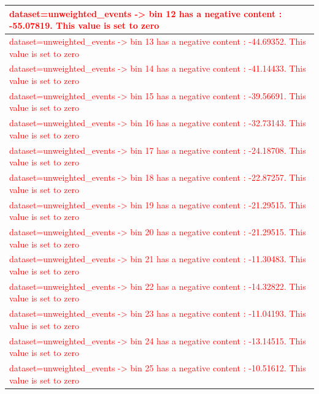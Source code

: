 \documentclass[a4paper, 10pt]{article}
\begin{document}
\begin{table}[H]
\begin{center}
\begin{tabular}{|m{140.0mm}|}
      \hline
      {\cellcolor{white}\textcolor{red}{dataset=unweighted\_events -> bin 12 has a negative content : -55.07819. This value is set to zero}}\\
      \hline
      {\cellcolor{white}\textcolor{red}{dataset=unweighted\_events -> bin 13 has a negative content : -44.69352. This value is set to zero}}\\
      \hline
      {\cellcolor{white}\textcolor{red}{dataset=unweighted\_events -> bin 14 has a negative content : -41.14433. This value is set to zero}}\\
      \hline
      {\cellcolor{white}\textcolor{red}{dataset=unweighted\_events -> bin 15 has a negative content : -39.56691. This value is set to zero}}\\
      \hline
      {\cellcolor{white}\textcolor{red}{dataset=unweighted\_events -> bin 16 has a negative content : -32.73143. This value is set to zero}}\\
      \hline
      {\cellcolor{white}\textcolor{red}{dataset=unweighted\_events -> bin 17 has a negative content : -24.18708. This value is set to zero}}\\
      \hline
      {\cellcolor{white}\textcolor{red}{dataset=unweighted\_events -> bin 18 has a negative content : -22.87257. This value is set to zero}}\\
      \hline
      {\cellcolor{white}\textcolor{red}{dataset=unweighted\_events -> bin 19 has a negative content : -21.29515. This value is set to zero}}\\
      \hline
      {\cellcolor{white}\textcolor{red}{dataset=unweighted\_events -> bin 20 has a negative content : -21.29515. This value is set to zero}}\\
      \hline
      {\cellcolor{white}\textcolor{red}{dataset=unweighted\_events -> bin 21 has a negative content : -11.30483. This value is set to zero}}\\
      \hline
      {\cellcolor{white}\textcolor{red}{dataset=unweighted\_events -> bin 22 has a negative content : -14.32822. This value is set to zero}}\\
      \hline
      {\cellcolor{white}\textcolor{red}{dataset=unweighted\_events -> bin 23 has a negative content : -11.04193. This value is set to zero}}\\
      \hline
      {\cellcolor{white}\textcolor{red}{dataset=unweighted\_events -> bin 24 has a negative content : -13.14515. This value is set to zero}}\\
      \hline
      {\cellcolor{white}\textcolor{red}{dataset=unweighted\_events -> bin 25 has a negative content : -10.51612. This value is set to zero}}\\

\end{tabular}
\end{center}
\end{table}
\end{document}
